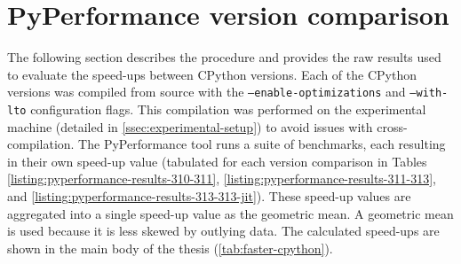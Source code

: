 \chapter{PyPerformance version comparison}
\label{chap:pyperformance-version-comparison}

The following section describes the procedure and provides the raw results used to evaluate the speed-ups between CPython versions.
Each of the CPython versions was compiled from source with the \texttt{--enable-optimizations} and \texttt{--with-lto} configuration flags. This compilation was performed on the experimental machine (detailed in \autoref{ssec:experimental-setup}) to avoid issues with cross-compilation.
The PyPerformance tool runs a suite of benchmarks, each resulting in their own speed-up value (tabulated for each version comparison in Tables \ref{listing:pyperformance-results-310-311}, \ref{listing:pyperformance-results-311-313}, and \ref{listing:pyperformance-results-313-313-jit}). These speed-up values are aggregated into a single speed-up value as the geometric mean. %
A geometric mean is used because it is less skewed by outlying data. %
The calculated speed-ups are shown in the main body of the thesis (\autoref{tab:faster-cpython}).

\vspace{2em}


\vspace{2em}

